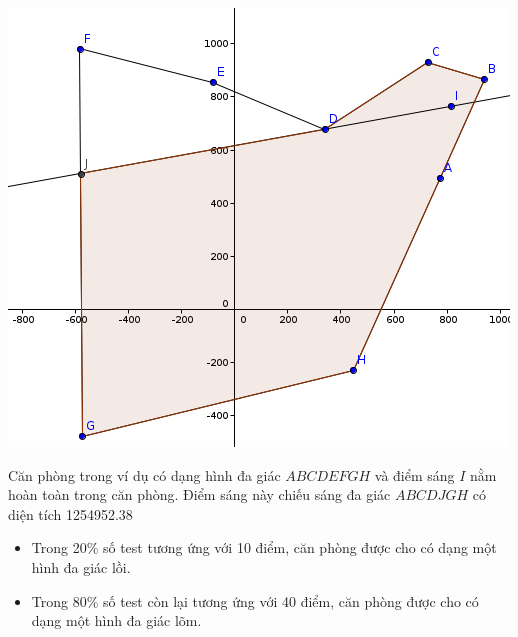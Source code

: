 \documentclass[11pt,a4paper,oneside]{article}
\begin{document}
\begin{center}
\includegraphics[scale=1.0]{anhsang.png}
\end{center}
Căn phòng trong ví dụ có dạng hình đa giác $ABCDEFGH$ và điểm sáng $I$ nằm hoàn toàn trong căn phòng. Điểm sáng này chiếu sáng đa giác $ABCDJGH$ có diện tích 1254952.38
\begin{itemize}
\item Trong 20\% số test tương ứng với 10 điểm, căn phòng được cho có dạng một hình đa giác lồi.
\item Trong 80\% số test còn lại tương ứng với 40 điểm, căn phòng được cho có dạng một hình đa giác lõm. 
\end{itemize}
\end{document}
